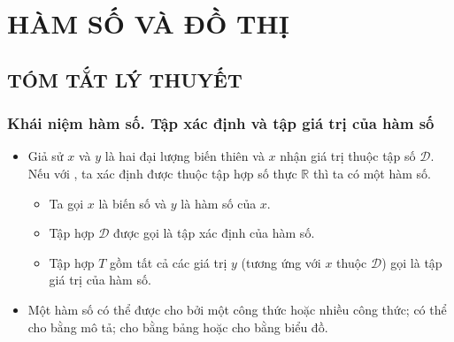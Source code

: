 \section{HÀM SỐ VÀ ĐỒ THỊ}
\subsection{TÓM TẮT LÝ THUYẾT}
\subsubsection{Khái niệm hàm số. Tập xác định và tập giá trị của hàm số}
\begin{itemize}
	\item [\iconMT]  Giả sử $x$ và $y$ là hai đại lượng biến thiên và $x$ nhận giá trị thuộc tập số $\mathscr{D}$.	Nếu với , ta xác định được  thuộc tập hợp số thực $\mathbb{R}$ thì ta có một hàm số.
	\begin{boxkn}
		\begin{itemize}
			\item Ta gọi $x$ là biến số và $y$ là hàm số của $x$.
			\item Tập hợp $\mathscr{D}$ được gọi là tập xác định của hàm số.
			\item Tập hợp $T$ gồm tất cả các giá trị $y$ (tương ứng với $x$ thuộc $\mathscr{D}$) gọi là tập giá trị của hàm số.
		\end{itemize}
	\end{boxkn}
	\item [\iconMT]  Một hàm số có thể được cho bởi một công thức hoặc nhiều công thức; có thể cho bằng mô tả; cho bằng bảng hoặc cho bằng biểu đồ.
\end{itemize}
